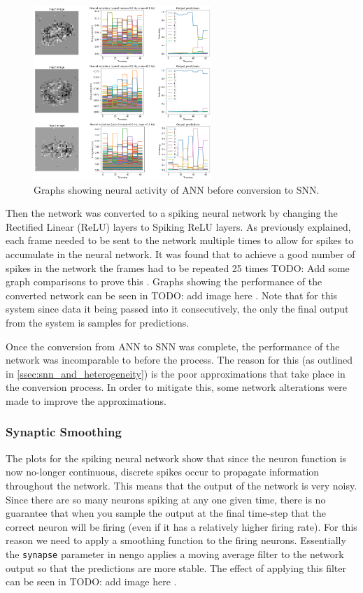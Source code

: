 \begin{figure}[htb]%
    \centering
    \includegraphics[width=0.6\textwidth]{implementation/images/pre_snn_conversion.png}
    \caption{Graphs showing neural activity of ANN before conversion to SNN.}%
    \label{fig:pre_snn_conversion}%
\end{figure}

Then the network was converted to a spiking neural network by changing the Rectified Linear (ReLU) layers to Spiking ReLU layers. As previously explained, each frame needed to be sent to the network multiple times to allow for spikes to accumulate in the neural network. It was found that to achieve a good number of spikes in the network the frames had to be repeated 25 times \color{red} TODO: Add some graph comparisons to prove this \color{black}. Graphs showing the performance of the converted network can be seen in \color{red} TODO: add image here \color{black}. Note that for this system since data it being passed into it consecutively, the only the final output from the system is samples for predictions.

Once the conversion from ANN to SNN was complete, the performance of the network was incomparable to before the process. The reason for this (as outlined in \cref{ssec:snn_and_heterogeneity}) is the poor approximations that take place in the conversion process. In order to mitigate this, some network alterations were made to improve the approximations.

\subsubsection{Synaptic Smoothing}

The plots for the spiking neural network show that since the neuron function is now no-longer continuous, discrete spikes occur to propagate information throughout the network. This means that the output of the network is very noisy. Since there are so many neurons spiking at any one given time, there is no guarantee that when you sample the output at the final time-step that the correct neuron will be firing (even if it has a relatively higher firing rate). For this reason we need to apply a smoothing function to the firing neurons. Essentially the \lstinline{synapse} parameter in nengo applies a moving average filter to the network output so that the predictions are more stable. The effect of applying this filter can be seen in \color{red} TODO: add image here \color{black}.

